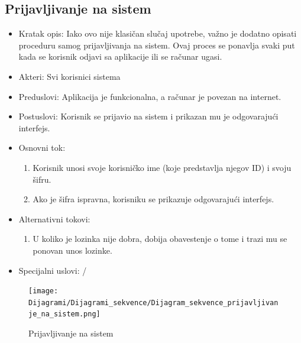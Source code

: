 \documentclass[a4paper]{article}
\begin{document}
\subsection{Prijavljivanje na sistem}
\label{subsec:prijavljivanje}

\begin{itemize}
    \item Kratak opis: Iako ovo nije klasičan slučaj upotrebe, važno je dodatno opisati proceduru samog prijavljivanja na sistem. Ovaj proces se ponavlja svaki put kada se korisnik odjavi sa aplikacije ili se računar ugasi.
    \item Akteri: Svi korisnici sistema
    \item Preduslovi: Aplikacija je funkcionalna, a računar je povezan na internet.
    \item Postuslovi: Korisnik se prijavio na sistem i prikazan mu je odgovarajući interfejs.
    \item Osnovni tok:
        \begin{enumerate}
            \item Korisnik unosi svoje korisničko ime (koje predstavlja njegov ID) i svoju šifru.
            \item Ako je šifra ispravna, korisniku se prikazuje odgovarajući interfejs.
        \end{enumerate}
    \item Alternativni tokovi:
     \begin{enumerate}
            \item  U koliko je lozinka nije dobra, dobija obavestenje o tome i trazi mu se ponovan unos lozinke.
    \end{enumerate}
    \item Specijalni uslovi: /
\end{itemize}

\begin{figure}[H]
\begin{center}
\texttt{[image: Dijagrami/Dijagrami\_sekvence/Dijagram\_sekvence\_prijavljivanje\_na\_sistem.png]}
\end{center}
\caption{Prijavljivanje na sistem}
\label{fig:prijavljivanje}
\end{figure}
\end{document}
